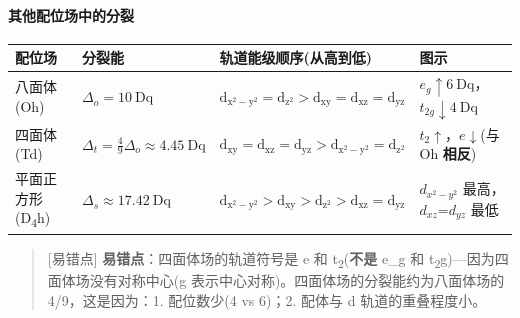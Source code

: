 \paragraph{其他配位场中的分裂}\label{ux5176ux4ed6ux914dux4f4dux573aux4e2dux7684ux5206ux88c2}

{\def\LTcaptype{none} %
\begin{longtable}[]{@{}
  >{\centering\arraybackslash}p{}
  >{\centering\arraybackslash}p{}
  >{\raggedright\arraybackslash}p{}
  >{\centering\arraybackslash}p{}@{}}
\toprule\noalign{}
\begin{minipage}[b]{\linewidth}\centering
配位场
\end{minipage} & \begin{minipage}[b]{\linewidth}\centering
分裂能
\end{minipage} & \begin{minipage}[b]{\linewidth}\raggedright
轨道能级顺序(从高到低)
\end{minipage} & \begin{minipage}[b]{\linewidth}\centering
图示
\end{minipage} \\
\midrule\noalign{}
\endhead
\bottomrule\noalign{}
\endlastfoot
八面体(Oh) & \(\Delta_o = 10\ \mathrm{Dq}\) & \(\mathrm{d_{x^2-y^2} = d_{z^2} > d_{xy} = d_{xz} = d_{yz}}\) & \(e_g \uparrow 6\ \mathrm{Dq}\)，\(t_{2g} \downarrow 4\ \mathrm{Dq}\) \\
四面体(Td) & \(\Delta_t = \frac{4}{9}\Delta_o \approx 4.45\ \mathrm{Dq}\) & \(\mathrm{d_{xy} = d_{xz} = d_{yz} > d_{x^2-y^2} = d_{z^2}}\) & \(t_2 \uparrow\)，\(e \downarrow\)(与 Oh \textbf{相反}) \\
平面正方形(D\textsubscript{4}h) & \(\Delta_s \approx 17.42\ \mathrm{Dq}\) & \(\mathrm{d_{x^2-y^2} > d_{xy} > d_{z^2} > d_{xz} = d_{yz}}\) & \(d_{x^{2}-y^{2}}\) 最高，\(d_{xz}\)=\(d_{yz}\) 最低 \\
\end{longtable}
}

\begin{quote}
{[}易错点{]} \textbf{易错点}：四面体场的轨道符号是 e 和 t\textsubscript{2}(\textbf{不是} e\_g 和 t\textsubscript{2}g)---因为四面体场没有对称中心(g 表示中心对称)。四面体场的分裂能约为八面体场的 4/9，这是因为：1. 配位数少(4 vs 6)；2. 配体与 d 轨道的重叠程度小。
\end{quote}


